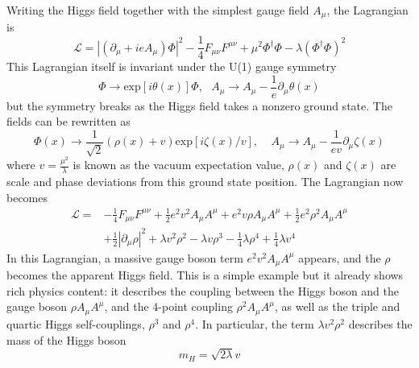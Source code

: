 Writing the Higgs field together with the simplest gauge field $A_{\mu}$, the Lagrangian is 
\begin{equation}\label{eq:Higgs_gauge_Lag}
  \mathcal{L} = |(\partial_{\mu}+ieA_{\mu})\Phi|^{2} -\frac{1}{4}F_{\mu\nu}F^{\mu\nu} + \mu^{2} \Phi^{\dagger}\Phi - \lambda(\Phi^{\dagger}\Phi)^{2}
\end{equation}
This Lagrangian itself is invariant under the U(1) gauge symmetry
\begin{equation}\label{eq:U1_trans}
    \Phi \to \text{exp}[i\theta(x)]\Phi, ~~~ A_{\mu} \to A_{\mu} - \frac{1}{e} \partial_{\mu}\theta(x)  
\end{equation}
but the symmetry breaks as the Higgs field takes a nonzero ground state.
The fields can be rewritten as
\begin{equation}\label{eq:Higgs_perturb_form}
    \Phi(x) \to \frac{1}{\sqrt{2}} (\rho(x)+v)\text{exp}[i\zeta(x)/v], ~~~~~
    A_{\mu} \to A_{\mu} - \frac{1}{ev} \partial_{\mu}\zeta(x)
\end{equation}
where $v = \frac{\mu^{2}}{\lambda}$ is known as the vacuum expectation value,
$\rho(x)$ and $\zeta(x)$ are scale and phase deviations from this ground state position.
The Lagrangian now becomes 
\begin{equation}\label{eq:local_Higgs_gauge_Lag}
  \begin{split}
    \mathcal{L} = & -\frac{1}{4}F_{\mu\nu}F^{\mu\nu} + \frac{1}{2} e^{2}v^{2}A_{\mu}A^{\mu} 
                    + e^{2}v \rho A_{\mu}A^{\mu} + \frac{1}{2} e^{2}\rho^{2}A_{\mu}A^{\mu} \\
                  & + \frac{1}{2} |\partial_{\mu}\rho|^{2} + \lambda v^{2} \rho^{2} 
                    - \lambda v \rho^{3} - \frac{1}{4} \lambda \rho^{4} + \frac{1}{4} \lambda v^{4}   
  \end{split}
\end{equation}
In this Lagrangian, a massive gauge boson term $e^{2}v^{2}A_{\mu}A^{\mu}$ appears,
and the $\rho$ becomes the apparent Higgs field.
This is a simple example but it already shows rich physics content:
it describes the coupling between the Higgs boson and the gauge boson $\rho A_{\mu}A^{\mu}$,
and the 4-point coupling $\rho^{2}A_{\mu}A^{\mu}$,
as well as the triple and quartic Higgs self-couplings, $\rho^{3}$ and $\rho^{4}$.
In particular, the term $\lambda v^{2} \rho^{2}$ describes the mass of the Higgs boson
\begin{equation}\label{eq:Higgs_mass}
    m_{H} = \sqrt{2\lambda} v
\end{equation}

